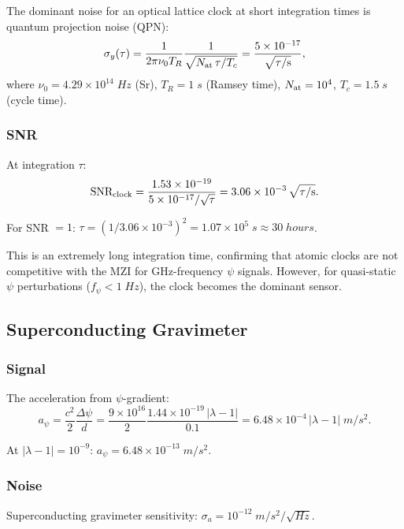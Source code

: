 \documentclass[aps,prd,twocolumn,superscriptaddress,nofootinbib]{revtex4-2}
\newcommand{\ee}[1]{\times 10^{#1}}
\begin{document}
The dominant noise for an optical lattice clock at short
integration times is quantum projection noise (QPN):
\begin{equation}
\sigma_y(\tau) = \frac{1}{2\pi\nu_0 T_R}\frac{1}{\sqrt{N_{\rm at}\,\tau/T_c}}
= \frac{5\ee{-17}}{\sqrt{\tau/\si{s}}},
\end{equation}
where $\nu_0 = 4.29\ee{14}\;\si{Hz}$ (Sr), $T_R = 1\;\si{s}$
(Ramsey time), $N_{\rm at} = 10^4$, $T_c = 1.5\;\si{s}$ (cycle time).

\subsubsection{SNR}

At integration $\tau$:
\begin{equation}
\text{SNR}_{\rm clock} = \frac{1.53\ee{-19}}{5\ee{-17}/\sqrt{\tau}}
= 3.06\ee{-3}\,\sqrt{\tau/\si{s}}.
\end{equation}

For SNR $= 1$: $\tau = (1/3.06\ee{-3})^2 = 1.07\ee{5}\;\si{s} \approx 30\;\si{hours}$.

This is an extremely long integration time, confirming that
atomic clocks are not competitive with the MZI for GHz-frequency
$\psi$ signals.  However, for quasi-static $\psi$ perturbations
($f_\psi < 1\;\si{Hz}$), the clock becomes the dominant sensor.

\subsection{Superconducting Gravimeter}

\subsubsection{Signal}

The acceleration from $\psi$-gradient:
\begin{equation}
a_\psi = \frac{c^2}{2}\frac{\Delta\psi}{d} = \frac{9\ee{16}}{2}\frac{1.44\ee{-19}\,|\lambda-1|}{0.1}
= 6.48\ee{-4}\,|\lambda-1|\;\si{m/s^2}.
\end{equation}

At $|\lambda-1| = 10^{-9}$: $a_\psi = 6.48\ee{-13}\;\si{m/s^2}$.

\subsubsection{Noise}

Superconducting gravimeter sensitivity:
$\sigma_a = 10^{-12}\;\si{m/s^2/\sqrt{Hz}}$.
\end{document}
